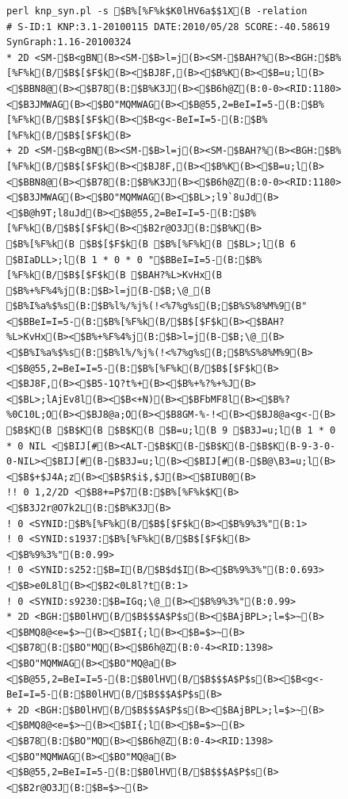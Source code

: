 \documentclass[a4j]{jarticle}
\begin{document}
{\begin{figure}[t]
\footnotesize
\begin{center}
\begin{minipage}{\hsize}
\begin{verbatim}
perl knp_syn.pl -s $B%[%F%k$K0lHV6a$$1X(B -relation
# S-ID:1 KNP:3.1-20100115 DATE:2010/05/28 SCORE:-40.58619 SynGraph:1.16-20100324
* 2D <SM-$B<gBN(B><SM-$B>l=j(B><SM-$BAH?%(B><BGH:$B%[%F%k(B/$B$[$F$k(B><$BJ8F,(B><$B%K(B><$B=u;l(B><$BBN8@(B><$B78(B:$B%K3J(B><$B6h@Z(B:0-0><RID:1180><$B3JMWAG(B><$BO"MQMWAG(B><$B@55,2=BeI=I=5-(B:$B%[%F%k(B/$B$[$F$k(B><$B<g<-BeI=I=5-(B:$B%[%F%k(B/$B$[$F$k(B>
+ 2D <SM-$B<gBN(B><SM-$B>l=j(B><SM-$BAH?%(B><BGH:$B%[%F%k(B/$B$[$F$k(B><$BJ8F,(B><$B%K(B><$B=u;l(B><$BBN8@(B><$B78(B:$B%K3J(B><$B6h@Z(B:0-0><RID:1180><$B3JMWAG(B><$BO"MQMWAG(B><$BL>;l9`8uJd(B><$B@h9T;l8uJd(B><$B@55,2=BeI=I=5-(B:$B%[%F%k(B/$B$[$F$k(B><$B2r@O3J(B:$B%K(B>
$B%[%F%k(B $B$[$F$k(B $B%[%F%k(B $BL>;l(B 6 $BIaDLL>;l(B 1 * 0 * 0 "$BBeI=I=5-(B:$B%[%F%k(B/$B$[$F$k(B $BAH?%L>KvHx(B $B%+%F%4%j(B:$B>l=j(B-$B;\@_(B $B%I%a%$%s(B:$B%l%/%j%(!<%7%g%s(B;$B%S%8%M%9(B" <$BBeI=I=5-(B:$B%[%F%k(B/$B$[$F$k(B><$BAH?%L>KvHx(B><$B%+%F%4%j(B:$B>l=j(B-$B;\@_(B><$B%I%a%$%s(B:$B%l%/%j%(!<%7%g%s(B;$B%S%8%M%9(B><$B@55,2=BeI=I=5-(B:$B%[%F%k(B/$B$[$F$k(B><$BJ8F,(B><$B5-1Q?t%+(B><$B%+%?%+%J(B><$BL>;lAjEv8l(B><$B<+N)(B><$BFbMF8l(B><$B%?%0C10L;O(B><$BJ8@a;O(B><$B8GM-%-!<(B><$BJ8@a<g<-(B>
$B$K(B $B$K(B $B$K(B $B=u;l(B 9 $B3J=u;l(B 1 * 0 * 0 NIL <$BIJ[#(B><ALT-$B$K(B-$B$K(B-$B$K(B-9-3-0-0-NIL><$BIJ[#(B-$B3J=u;l(B><$BIJ[#(B-$B@\B3=u;l(B><$B$+$J4A;z(B><$B$R$i$,$J(B><$BIUB0(B>
!! 0 1,2/2D <$B8+=P$7(B:$B%[%F%k$K(B><$B3J2r@O7k2L(B:$B%K3J(B>
! 0 <SYNID:$B%[%F%k(B/$B$[$F$k(B><$B%9%3%"(B:1>
! 0 <SYNID:s1937:$B%[%F%k(B/$B$[$F$k(B><$B%9%3%"(B:0.99>
! 0 <SYNID:s252:$B=I(B/$B$d$I(B><$B%9%3%"(B:0.693><$B>e0L8l(B><$B2<0L8l?t(B:1>
! 0 <SYNID:s9230:$B=IGq;\@_(B><$B%9%3%"(B:0.99>
* 2D <BGH:$B0lHV(B/$B$$$A$P$s(B><$BAjBPL>;l=$>~(B><$BMQ8@<e=$>~(B><$BI{;l(B><$B=$>~(B><$B78(B:$BO"MQ(B><$B6h@Z(B:0-4><RID:1398><$BO"MQMWAG(B><$BO"MQ@a(B><$B@55,2=BeI=I=5-(B:$B0lHV(B/$B$$$A$P$s(B><$B<g<-BeI=I=5-(B:$B0lHV(B/$B$$$A$P$s(B>
+ 2D <BGH:$B0lHV(B/$B$$$A$P$s(B><$BAjBPL>;l=$>~(B><$BMQ8@<e=$>~(B><$BI{;l(B><$B=$>~(B><$B78(B:$BO"MQ(B><$B6h@Z(B:0-4><RID:1398><$BO"MQMWAG(B><$BO"MQ@a(B><$B@55,2=BeI=I=5-(B:$B0lHV(B/$B$$$A$P$s(B><$B2r@O3J(B:$B=$>~(B>

\end{verbatim}
\end{minipage}
\end{center}
\end{figure}}
\end{document}
